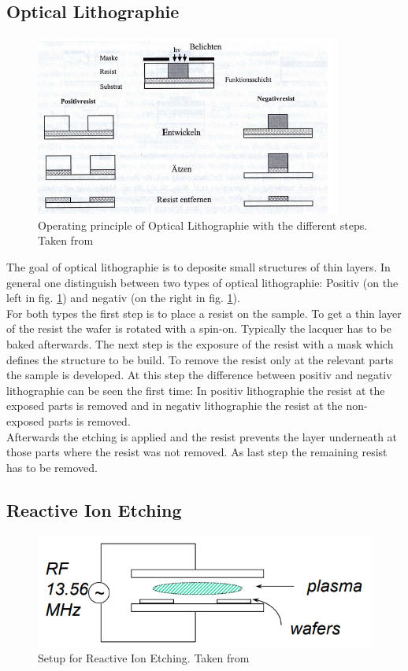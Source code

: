 \documentclass[%
 reprint,
amsmath,amssymb,
pra,
]{revtex4-1}
\begin{document}
\subsection{Optical Lithographie}

\begin{figure}
\centering
\includegraphics[scale=1.0]{Bilder/Lithographie.PNG}
\caption{Operating principle of Optical Lithographie with the different steps. Taken from \cite{Volklein00}}
\label{fig:Lithographie}
\end{figure}

The goal of optical lithographie is to deposite small structures of thin layers. In general one distinguish between two types of optical lithographie: Positiv (on the left in fig. \ref{fig:Lithographie}) and negativ (on the right in fig. \ref{fig:Lithographie}). \\
For both types the first step is to place a resist on the sample. To get a thin layer of the resist the wafer is rotated with a spin-on. Typically the lacquer has to be baked afterwards. The next step is the exposure of the resist with a mask which defines the structure to be build. To remove the resist only at the relevant parts the sample is developed. At this step the difference between positiv and negativ lithographie can be seen the first time: In positiv lithographie the resist at the exposed parts is removed and in negativ lithographie the resist at the non-exposed parts is removed. \\
Afterwards the etching is applied and the resist prevents the layer underneath at those parts where the resist was not removed. As last step the remaining resist has to be removed.


\subsection{Reactive Ion Etching}

\begin{figure}
\centering
\includegraphics[scale=0.5]{Bilder/Reactive_Ion_Etching.PNG}
\caption{Setup for Reactive Ion Etching. Taken from \cite{Cheung}}
\label{fig:Reactive_Ion_Etching}
\end{figure}
\end{document}
